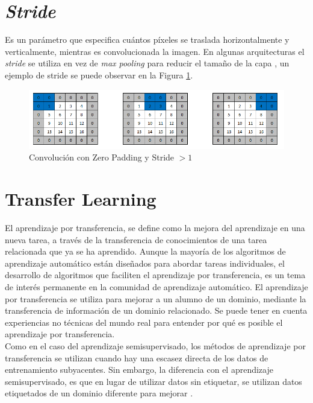 \section{\textit{Stride}}


Es un parámetro que especifica cuántos píxeles se traslada horizontalmente y verticalmente, mientras es convolucionada la imagen. En algunas arquitecturas el \textit{stride} se utiliza en vez de \textit{max pooling} para reducir el tamaño de la capa \cite{murphy2016overview}, un ejemplo de stride se puede observar en la Figura \ref{stride}.

\begin{figure}[ht]
	\centering
	\includegraphics[scale=0.5]{Figs/stride.png}
	\caption{Convolución con Zero Padding y Stride $> 1$}
	\label{stride}
\end{figure}

\newpage
\section{Transfer Learning}
El aprendizaje por transferencia, se define como la mejora del aprendizaje en una nueva tarea, a través de la transferencia de conocimientos de una tarea relacionada que ya se ha aprendido. Aunque la mayoría de los algoritmos de aprendizaje automático están diseñados para abordar tareas individuales, el desarrollo de algoritmos que faciliten el aprendizaje por transferencia, es un tema de interés permanente en la comunidad de aprendizaje automático. El aprendizaje por transferencia se utiliza para mejorar a un alumno de un dominio, mediante la transferencia de información de un dominio relacionado. Se puede tener en cuenta experiencias no técnicas del mundo real para entender por qué es posible el aprendizaje por transferencia.\\

Como en el caso del aprendizaje semisupervisado, los métodos de aprendizaje por transferencia se utilizan cuando hay una escasez directa de los datos de entrenamiento subyacentes. Sin embargo, la diferencia con el aprendizaje semisupervisado, es que en lugar de utilizar datos sin etiquetar, se utilizan datos etiquetados de un dominio diferente para mejorar \cite{ref_14}.

